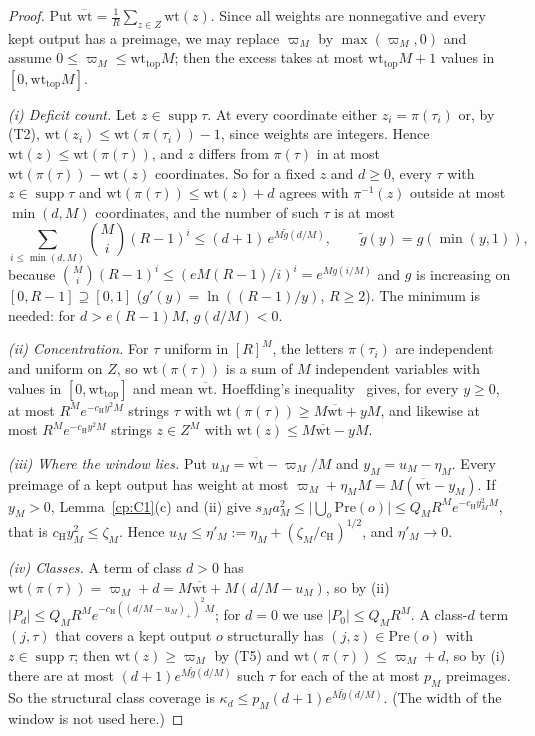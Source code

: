 \documentclass[11pt]{article}
\theoremstyle{definition}
\theoremstyle{remark}
\newcommand{\abs}[1]{\lvert #1\rvert}
\DeclareMathOperator{\supp}{supp}
\newcommand{\Tcond}[1]{\textup{(T#1)}}        %
\newcommand{\wt}{\mathrm{wt}}                %
\newcommand{\wtop}{\mathrm{wt}_{\mathrm{top}}}
\newcommand{\wbar}{\overline{\mathrm{wt}}}
\newcommand{\Pre}{\mathrm{Pre}}              %
\newcommand{\cH}{c_{\mathrm H}}              %
\begin{document}
\begin{proof}
Put $\wbar=\frac1R\sum_{z\in Z}\wt(z)$. Since all weights are nonnegative and every kept output has a preimage, we may replace $\varpi_M$ by $\max(\varpi_M,0)$ and assume $0\le\varpi_M\le\wtop M$; then the excess takes at most $\wtop M+1$ values in $[0,\wtop M]$.

\emph{(i) Deficit count.} Let $z\in\supp\tau$. At every coordinate either $z_i=\pi(\tau_i)$ or, by \Tcond2, $\wt(z_i)\le\wt(\pi(\tau_i))-1$, since weights are integers. Hence $\wt(z)\le\wt(\pi(\tau))$, and $z$ differs from $\pi(\tau)$ in at most $\wt(\pi(\tau))-\wt(z)$ coordinates. So for a fixed $z$ and $d\ge0$, every $\tau$ with $z\in\supp\tau$ and $\wt(\pi(\tau))\le\wt(z)+d$ agrees with $\pi^{-1}(z)$ outside at most $\min(d,M)$ coordinates, and the number of such $\tau$ is at most
\[
\sum_{i\le\min(d,M)}\binom Mi(R-1)^i\le(d+1)\,e^{M\tilde g(d/M)},\qquad\tilde g(y)=g(\min(y,1)),
\]
because $\binom Mi(R-1)^i\le(eM(R-1)/i)^i=e^{Mg(i/M)}$ and $g$ is increasing on $[0,R-1]\supseteq[0,1]$ ($g'(y)=\ln((R-1)/y)$, $R\ge2$). The minimum is needed: for $d>e(R-1)M$, $g(d/M)<0$.

\emph{(ii) Concentration.} For $\tau$ uniform in $[R]^M$, the letters $\pi(\tau_i)$ are independent and uniform on $Z$, so $\wt(\pi(\tau))$ is a sum of $M$ independent variables with values in $[0,\wtop]$ and mean $\wbar$. Hoeffding's inequality~\cite{Hoe63} gives, for every $y\ge0$, at most $R^Me^{-\cH y^2M}$ strings $\tau$ with $\wt(\pi(\tau))\ge M\wbar+yM$, and likewise at most $R^Me^{-\cH y^2M}$ strings $z\in Z^M$ with $\wt(z)\le M\wbar-yM$.

\emph{(iii) Where the window lies.} Put $u_M=\wbar-\varpi_M/M$ and $y_M=u_M-\eta_M$. Every preimage of a kept output has weight at most $\varpi_M+\eta_MM=M(\wbar-y_M)$. If $y_M>0$, Lemma~\ref{cp:C1}(c) and (ii) give $s_Ma_M^2\le\abs{\bigcup_o\Pre(o)}\le Q_MR^Me^{-\cH y_M^2M}$, that is $\cH y_M^2\le\zeta_M$. Hence $u_M\le\eta'_M:=\eta_M+(\zeta_M/\cH)^{1/2}$, and $\eta'_M\to0$.

\emph{(iv) Classes.} A term of class $d>0$ has $\wt(\pi(\tau))=\varpi_M+d=M\wbar+M(d/M-u_M)$, so by (ii) $\abs{P_d}\le Q_MR^Me^{-\cH((d/M-u_M)_+)^2M}$; for $d=0$ we use $\abs{P_0}\le Q_MR^M$. A class-$d$ term $(j,\tau)$ that covers a kept output $o$ structurally has $(j,z)\in\Pre(o)$ with $z\in\supp\tau$; then $\wt(z)\ge\varpi_M$ by \Tcond5{} and $\wt(\pi(\tau))\le\varpi_M+d$, so by (i) there are at most $(d+1)e^{M\tilde g(d/M)}$ such $\tau$ for each of the at most $p_M$ preimages. So the structural class coverage is $\kappa_d\le p_M(d+1)e^{M\tilde g(d/M)}$. (The width of the window is not used here.)


\end{proof}
\end{document}
